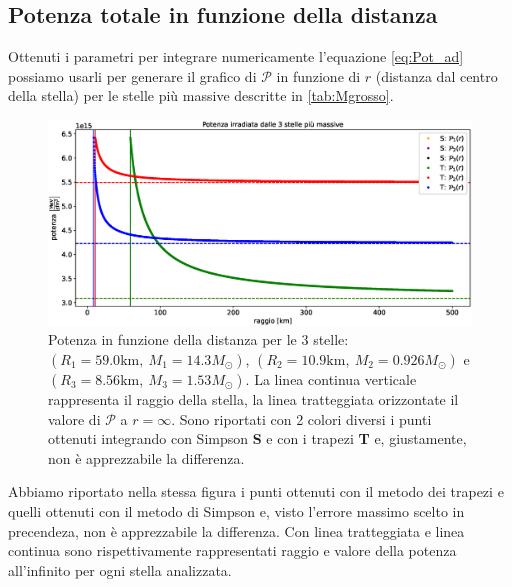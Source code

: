 \documentclass[a4paper, titlepage]{article}
\begin{document}
\newpage
\subsection{Potenza totale in funzione della distanza}

Ottenuti i parametri per integrare numericamente l'equazione \ref{eq:Pot_ad} possiamo usarli per generare il grafico di $\mathcal{P}$ in funzione di $r$ (distanza dal centro della stella) per le stelle più massive descritte in \ref{tab:Mgrosso}.

\begin{figure}[h]
    \centering
    \includegraphics[width = \textwidth]{Figures/Pot.eps}
    \caption{Potenza in funzione della distanza per le 3 stelle: $(R_1 = 59.0 \unit{\kilo\meter},~M_1 = 14.3 M_\odot)$, $(R_2 = 10.9 \unit{\kilo\meter},~M_2 = 0.926 M_\odot)$ e $(R_3 = 8.56 \unit{\kilo\meter},~M_3 = 1.53 M_\odot)$.
    La linea continua verticale rappresenta il raggio della stella, la linea tratteggiata orizzontate il valore di $\mathcal{P}$ a $r = \infty$.
    Sono riportati con 2 colori diversi i punti ottenuti integrando con Simpson \textbf{S} e con i trapezi \textbf{T} e, giustamente, non è apprezzabile la differenza.}
    \label{fig:Poi}
\end{figure}

Abbiamo riportato nella stessa figura i punti ottenuti con il metodo dei trapezi e quelli ottenuti con il metodo di Simpson e, visto l'errore massimo scelto in precendeza, non è apprezzabile la differenza.
Con linea tratteggiata e linea continua sono rispettivamente rappresentati raggio e valore della potenza all'infinito per ogni stella analizzata.
\end{document}
